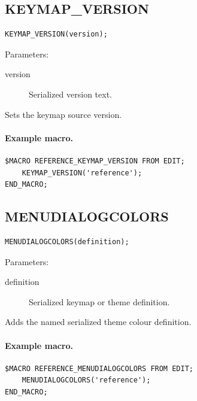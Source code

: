\documentclass[a4paper,10pt,twoside,openany]{book}
\newenvironment{mrmacextension}{\begin{changebar}}{\end{changebar}}
\begin{document}
\begin{mrmacextension}
\label{prim:procedure-keymap-version}
\subsection*{KEYMAP\_VERSION}
\begin{verbatim}
KEYMAP_VERSION(version);
\end{verbatim}
Parameters:
\begin{description}
\item[version] Serialized version text.
\end{description}

Sets the keymap source version.

\paragraph{Example macro.}
\begin{verbatim}
$MACRO REFERENCE_KEYMAP_VERSION FROM EDIT;
    KEYMAP_VERSION('reference');
END_MACRO;
\end{verbatim}
\end{mrmacextension}

\begin{mrmacextension}
\label{prim:procedure-menudialogcolors}
\subsection*{MENUDIALOGCOLORS}
\begin{verbatim}
MENUDIALOGCOLORS(definition);
\end{verbatim}
Parameters:
\begin{description}
\item[definition] Serialized keymap or theme definition.
\end{description}

Adds the named serialized theme colour definition.

\paragraph{Example macro.}
\begin{verbatim}
$MACRO REFERENCE_MENUDIALOGCOLORS FROM EDIT;
    MENUDIALOGCOLORS('reference');
END_MACRO;
\end{verbatim}
\end{mrmacextension}
\end{document}
